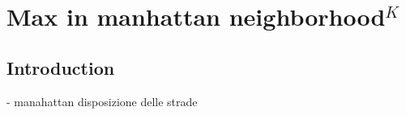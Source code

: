 %



\chapter{Max in manhattan neighborhood$^{K}$}
\label{ch:max_manhattan}
\section*{Introduction}
- manahattan disposizione delle strade

